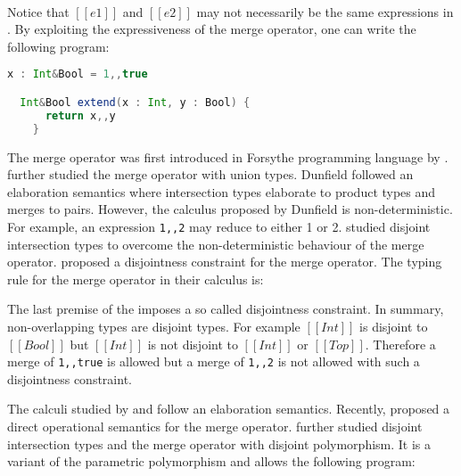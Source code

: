 

\begin{center}
   \ \ \ \citep{oliveira2016disjoint}
\end{center}

Notice that $[[e1]]$ and $[[e2]]$ may not necessarily be the same expressions in .
By exploiting the expressiveness of the merge operator, one can write the following program:

\begin{lstlisting}[language=Scala]
  x : Int&Bool = 1,,true

  Int&Bool extend(x : Int, y : Bool) {
      return x,,y
    }
\end{lstlisting}

The merge operator was first introduced in Forsythe programming language by 
\cite{reynolds1997design}.
\cite{dunfield2014elaborating} further studied the merge operator with
union types. Dunfield followed an elaboration semantics where
intersection types elaborate to product types and merges
to pairs.
However, the calculus
proposed by Dunfield is non-deterministic.
For example, an expression \lstinline{1,,2} may reduce to either 1 or 2.
\cite{oliveira2016disjoint} studied disjoint intersection types to
overcome the non-deterministic behaviour of the merge operator.
\cite{oliveira2016disjoint} proposed a disjointness constraint
for the merge operator. The typing rule for the
merge operator in their calculus is:

\begin{center}
\end{center}

\noindent The last premise of the  imposes a so called disjointness
constraint. In summary, non-overlapping types are disjoint types.
For example $[[Int]]$ is disjoint to $[[Bool]]$ but $[[Int]]$ is not disjoint
to $[[Int]]$ or $[[Top]]$. Therefore a merge of \lstinline{1,,true} is allowed but
a merge of \lstinline{1,,2} is not allowed with such a disjointness constraint.

The calculi studied by \cite{dunfield2014elaborating} and \cite{oliveira2016disjoint}
follow an elaboration semantics.
Recently, \cite{Huang:typedirected} proposed a direct operational
semantics for the merge operator.
\cite{alpuimdisjoint} further studied disjoint intersection types 
and the merge operator with disjoint polymorphism.
It is a variant of the parametric polymorphism \citep{cardelli1985understanding, canning1989f}
and allows the following program:

